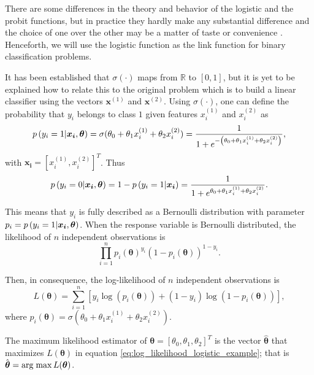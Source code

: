 There are some differences in the theory and behavior of the logistic and the probit functions, but in practice they hardly make any substantial difference and the choice of one over the other may be a matter of taste or convenience \cite[p.~118]{gelman2006data}. Henceforth, we will use the logistic function as the link function for binary classification problems.

It has been established that $\sigma \left( \cdot \right)$ maps from $\mathbb{R}$ to $\left[ 0,1 \right]$, but it is yet to be explained how to relate this to the original problem which is to build a linear classifier using the vectors $\boldsymbol{x}^{(1)}$ and $\boldsymbol{x}^{(2)}$. Using  $\sigma \left( \cdot \right)$, one can define the probability that $y_i$ belongs to class $1$ given features $x_i^{(1)}$ and $x_i^{(2)}$ as
\begin{equation}
  p\left( y_i = 1 | \boldsymbol{x_i}, \boldsymbol{\theta} \right) = \sigma(\theta_0 + \theta_1 x_i^{(1)} + \theta_2 x_i^{(2)}) = \frac{1}{1 + e^{-\left( \theta_0 + \theta_1 x_i^{(1)} + \theta_2 x_i^{(2)} \right)}},
\end{equation}
with $\boldsymbol{x_i} = \left[ x_i^{(1)}, x_i^{(2)} \right]^T$. Thus
\begin{equation}
  p\left( y_i = 0 | \boldsymbol{x_i}, \boldsymbol{\theta} \right) = 1 - p\left( y_i = 1 | \boldsymbol{x_i} \right) = \frac{1}{1 + e^{\theta_0 + \theta_1 x_i^{(1)} + \theta_2 x_i^{(2)}}}.
\end{equation}

This means that $y_i$ is fully described as a Bernoulli distribution with parameter $p_i =p\left( y_i = 1 | \boldsymbol{x_i}, \boldsymbol{\theta} \right)$. When the response variable is Bernoulli distributed, the likelihood of $n$ independent observations is
\begin{equation}
  \prod_{i = 1}^n  p_i(\boldsymbol{\theta})^{y_i}\left(1 - p_i(\boldsymbol{\theta}) \right)^{1 - y_i}.
\end{equation}

Then, in consequence, the log-likelihood of $n$ independent observations is
\begin{equation}
  \label{eq:log_likelihood_logistic_example}
  L(\boldsymbol{\theta}) = \sum_{i = 1}^n \left[ y_i \log\left( p_i(\boldsymbol{\theta}) \right) + (1 - y_i) \log \left( 1 - p_i(\boldsymbol{\theta}) \right) \right],
\end{equation}
where $p_i(\boldsymbol{\theta}) = \sigma(\theta_0 + \theta_1 x_i^{(1)} + \theta_2 x_i^{(2)})$.

The maximum likelihood estimator of $\boldsymbol{\theta} = \left[ \theta_0, \theta_1, \theta_2 \right]^T$ is the vector $\hat{\boldsymbol{\theta}}$ that maximizes $L(\boldsymbol{\theta})$ in equation \eqref{eq:log_likelihood_logistic_example}; that is $\hat{\boldsymbol{\theta}} = \operatorname*{arg\; max} L(\boldsymbol{\theta})$.

